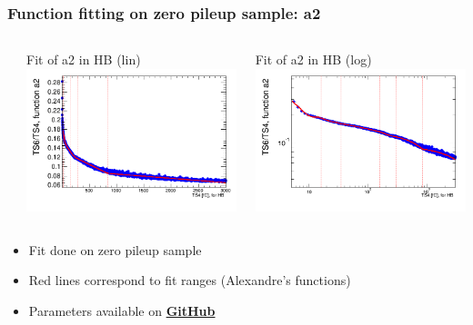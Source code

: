 \documentclass[bigger]{beamer}
\providecommand{\alert}[1]{\textbf{#1}}
\begin{document}
\begin{frame}
\frametitle{Function fitting on zero pileup sample: a2}
\label{sec-3-2-10}
\begin{columns} %
\label{sec-3-2-10-1}
\begin{column}{0.55\textwidth}
\label{sec-3-2-10-1-1}

\centering
Fit of a2 in HB (lin)
\includegraphics[width=\textwidth]{fig/a2_ring0_lin.png}
\end{column}
\begin{column}{0.55\textwidth}
\label{sec-3-2-10-1-2}

\centering
Fit of a2 in HB (log)
\includegraphics[width=\textwidth]{fig/a2_ring0_log.png}
\end{column}
\end{columns}
\label{sec-3-2-10-2}
\begin{itemize}

\item Fit done on zero pileup sample
\label{sec-3-2-10-2-1}%

\item Red lines correspond to fit ranges (Alexandre's functions)
\label{sec-3-2-10-2-2}%

\item Parameters available on \href{https://github.com/edmundaberry/HcalReco/blob/master/analysis/src/fitResults.C}{\alert{GitHub}}
\label{sec-3-2-10-2-3}%
\end{itemize} %
\end{frame}
\end{document}
